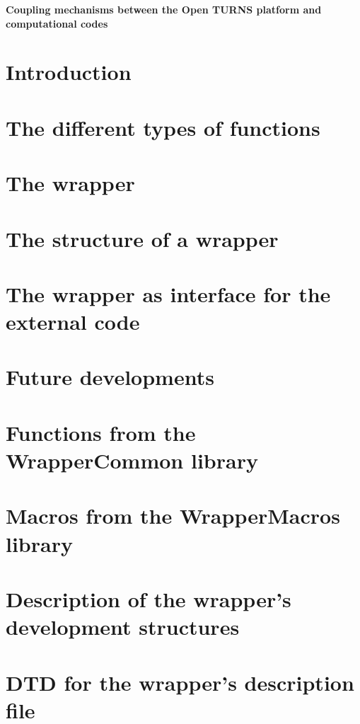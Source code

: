 \documentclass[a4paper,11pt]{book}
\begin{document}
\begin{titlepage}
  \vspace*{2cm}
  \begin{center}
    {\huge \bf Coupling mechanisms between the Open TURNS platform and computational codes}
  \end{center}
\end{titlepage}

\newpage


\cleardoublepage
\tableofcontents
\cleardoublepage


\cleardoublepage

\chapter{Introduction}

\cleardoublepage

\chapter{The different types of functions}

\cleardoublepage

\chapter{The wrapper}

\cleardoublepage

\chapter{The structure of a wrapper}

\cleardoublepage

\chapter{The wrapper as interface for the external code}

\cleardoublepage

\chapter{Future developments}

\cleardoublepage

\appendix
\chapter{Functions from the WrapperCommon library}

\cleardoublepage

\chapter{Macros from the WrapperMacros library}

\cleardoublepage

\chapter{Description of the wrapper's development structures}

\cleardoublepage

\chapter{DTD for the wrapper's description file}

\cleardoublepage

\printindex
\end{document}
